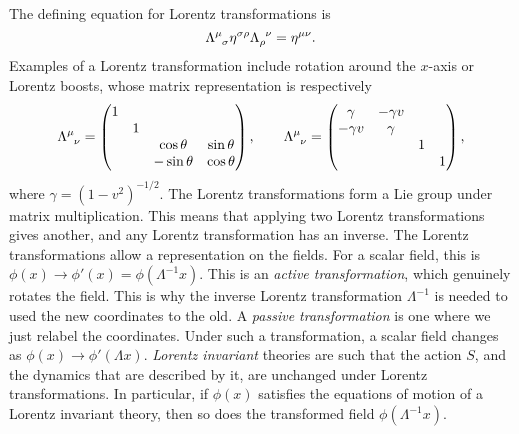 The defining equation for Lorentz transformations is
\begin{equation}
  \Lambda\indices{^\mu_\sigma}\eta\indices{^\sigma^\rho} \Lambda\indices{_\rho ^\nu} = \eta\indices{^\mu^\nu}.
\end{equation}
Examples of a Lorentz transformation include rotation around the $x$-axis or Lorentz boosts, whose matrix representation is respectively
\begin{equation}
  \Lambda\indices{^\mu_\nu} = 
  \begin{pmatrix}
   1 &  &  &  \\
    & 1 &  &  \\
    &  & \cos\theta & \sin\theta \\
    &  & -\sin\theta & \cos\theta \\
  \end{pmatrix},
  \qquad
  \Lambda\indices{^\mu_\nu} = 
  \begin{pmatrix}
   \gamma & -\gamma v &  &  \\
   -\gamma v & \gamma &  &  \\
    &  & 1 &  \\
    &  &  & 1 \\
  \end{pmatrix},
\end{equation}
where $\gamma = (1- v^2)^{-1/2}$.
The Lorentz transformations form a Lie group under matrix multiplication. This means that applying two Lorentz transformations gives another, and any Lorentz transformation has an inverse.
The Lorentz transformations allow a representation on the fields.
For a scalar field, this is $\phi(x) \to \phi'(x) = \phi(\Lambda^{-1} x)$. This is an \emph{active transformation}, which genuinely rotates the field. This is why the inverse Lorentz transformation $\Lambda^{-1}$ is needed to used the new coordinates to the old.
A \emph{passive transformation} is one where we just relabel the coordinates. Under such a transformation, a scalar field changes as $\phi(x) \to \phi'(\Lambda x)$.
\emph{Lorentz invariant} theories are such that the action $S$, and the dynamics that are described by it, are unchanged under Lorentz transformations.
In particular, if $\phi(x)$ satisfies the equations of motion of a Lorentz invariant theory, then so does the transformed field $\phi(\Lambda^{-1} x)$.

